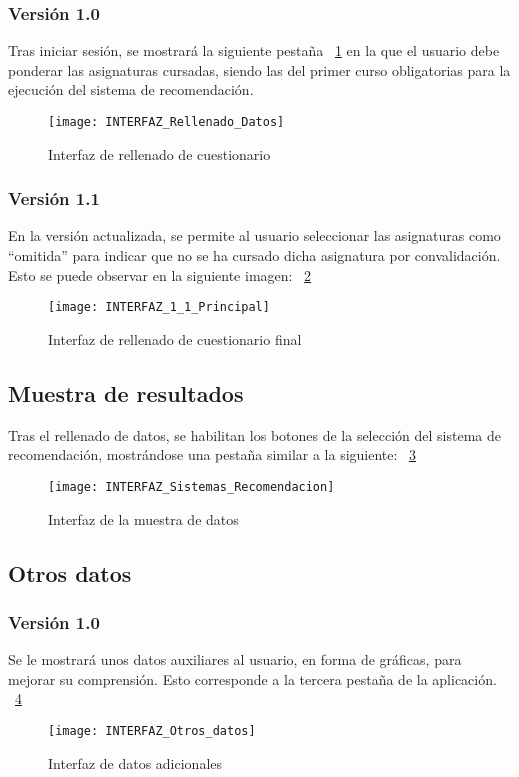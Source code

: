 \subsubsection{Versión 1.0}
Tras iniciar sesión, se mostrará la siguiente pestaña ~\ref{fig:C.3.2} en la que el usuario debe ponderar las asignaturas cursadas, siendo las del primer curso obligatorias para la ejecución del sistema de recomendación. 
\begin{figure}[h]
\centering
\texttt{[image: INTERFAZ\_Rellenado\_Datos]}
\caption{Interfaz de rellenado de cuestionario}
\label{fig:C.3.2}
\end{figure}

\subsubsection{Versión 1.1}
En la versión actualizada, se permite al usuario seleccionar las asignaturas como ``omitida'' para indicar que no se ha cursado dicha asignatura por convalidación. Esto se puede observar en la siguiente imagen: ~\ref{fig:C.3.3.1}
\begin{figure}[h]
\centering
\texttt{[image: INTERFAZ\_1\_1\_Principal]}
\caption{Interfaz de rellenado de cuestionario final}
\label{fig:C.3.3.1}
\end{figure}

\subsection{Muestra de resultados}
Tras el rellenado de datos, se habilitan los botones de la selección del sistema de recomendación, mostrándose una pestaña similar a la siguiente: ~\ref{fig:C.3.3}
\begin{figure}[h]
\centering
\texttt{[image: INTERFAZ\_Sistemas\_Recomendacion]}
\caption{Interfaz de la muestra de datos}
\label{fig:C.3.3}
\end{figure}

\subsection{Otros datos}
\subsubsection{Versión 1.0}
Se le mostrará unos datos auxiliares al usuario, en forma de gráficas, para mejorar su comprensión. Esto corresponde a la tercera pestaña de la aplicación. ~\ref{fig:C.3.4}
\begin{figure}[h]
\centering
\texttt{[image: INTERFAZ\_Otros\_datos]}
\caption{Interfaz de datos adicionales}
\label{fig:C.3.4}
\end{figure}
